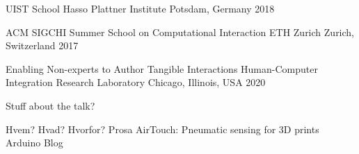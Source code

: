 \newpage
{}

    \begin{cventries}
      \cventry
        {UIST School}
        {Hasso Plattner Institute}
        {Potsdam, Germany}
        {2018}
        {}

      \cventry
        {ACM SIGCHI Summer School on Computational Interaction}
        {ETH Zurich}
        {Zurich, Switzerland}
        {2017}
        {}
    \end{cventries}

    \begin{cventries}
      \cventry
        {Enabling Non-experts to Author Tangible Interactions}
        {Human-Computer Integration Research Laboratory}
        {Chicago, Illinois, USA}
        {2020}
        {
          \begin{cvitems}
            \item{Stuff about the talk?}
          \end{cvitems}
          \vspace{1em}
        }
    \end{cventries}

    \begin{cventries}
      \cventry
        {Hvem? Hvad? Hvorfor?}
        {Prosa}
        {}
        {}
        {}
      \cventry
        {AirTouch: Pneumatic sensing for 3D prints}
        {Arduino Blog}
        {}
        {}
        {}
    \end{cventries}

